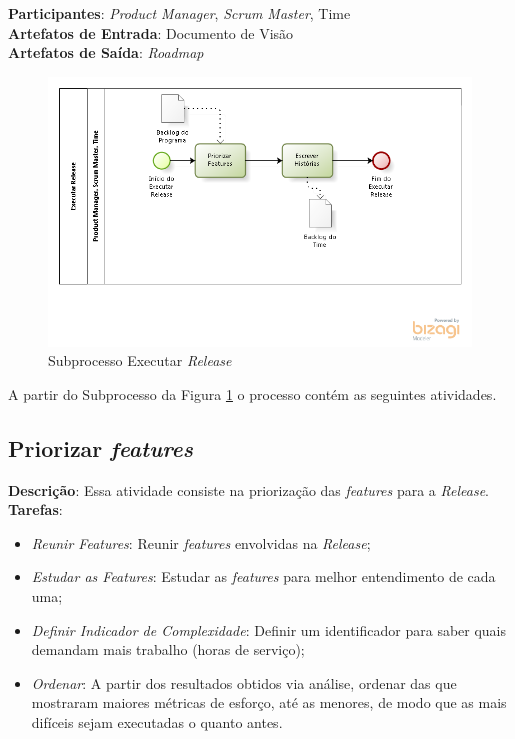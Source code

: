   \textbf{Participantes}: \textit{Product Manager}, \textit{Scrum Master}, Time \\

  \textbf{Artefatos de Entrada}: Documento de Visão \\

  \textbf{Artefatos de Saída}:  \textit{Roadmap}\\

\begin{figure}[!htb]
\centering
\includegraphics[scale=0.7]{figuras/release.png}
\caption{Subprocesso Executar \textit{Release}}
\label{fig:release}
\end{figure}

A partir do Subprocesso da Figura \ref{fig:release} o processo contém as seguintes atividades.

\subsection{Priorizar \textit{features}}
  \textbf{Descrição}: Essa atividade consiste na priorização das \textit{features} para a \textit{Release}. \\

  \textbf{Tarefas}:
  \begin{itemize}
   \item \indent \textit{Reunir \textit{Features}}: Reunir \textit{features} envolvidas na \textit{Release};

   \item \indent \textit{Estudar as \textit{Features}}: Estudar as \textit{features} para melhor entendimento de cada uma;

   \item \indent \textit{Definir Indicador de Complexidade}: Definir um identificador para saber quais demandam mais trabalho (horas de serviço);

   \item \indent \textit{Ordenar}: A partir dos resultados obtidos via análise, ordenar das que mostraram maiores métricas de esforço, até as menores, de modo que as mais difíceis sejam executadas o quanto antes.
  \end{itemize}

